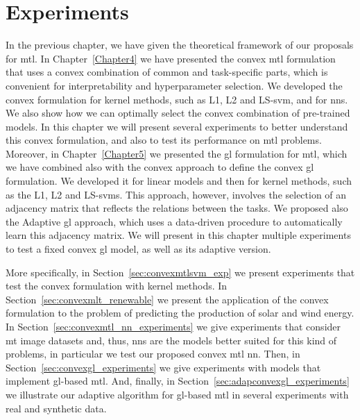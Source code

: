 
\chapter{Experiments} %
\label{Chapter6}


In the previous chapter, we have given the theoretical framework of our proposals for \acrfull{mtl}. In Chapter~\ref{Chapter4} we have presented the convex \acrshort{mtl} formulation that uses a convex combination of common and task-specific parts, which is convenient for interpretability and hyperparameter selection.
We developed the convex formulation for kernel methods, such as L1, L2 and LS-\acrfull{svm}, and for \acrfull{nns}. We also show how we can optimally select the convex combination of pre-trained models.
%
In this chapter we will present several experiments to better understand this convex formulation, and also to test its performance on \acrshort{mtl} problems.
%
Moreover, in Chapter~\ref{Chapter5} we presented the \acrfull{gl} formulation for \acrshort{mtl}, which we have combined also with the convex approach to define the convex \acrshort{gl} formulation.
We developed it for linear models and then for kernel methods, such as the L1, L2 and LS-\acrshort{svms}. This approach, however, involves the selection of an adjacency matrix that reflects the relations between the tasks. We proposed also the Adaptive \acrshort{gl} approach, which uses a data-driven procedure to automatically learn this adjacency matrix.
%
We will present in this chapter multiple experiments to test a fixed convex \acrshort{gl} model, as well as its adaptive version.
%

More specifically, in Section~\ref{sec:convexmtlsvm_exp} we present experiments that test the convex formulation with kernel methods. In Section~\ref{sec:convexmlt_renewable} we present the application of the convex formulation to the problem of predicting the production of solar and wind energy.
In Section~\ref{sec:convexmtl_nn_experiments} we give experiments that consider \acrfull{mt} image datasets and, thus, \acrshort{nns} are the models better suited for this kind of problems, in particular we test our proposed convex \acrshort{mtl} \acrshort{nn}. 
%
Then, in Section~\ref{sec:convexgl_experiments} we give experiments with models that implement \acrshort{gl}-based \acrshort{mtl}. And, finally, in Section~\ref{sec:adapconvexgl_experiments} we illustrate our adaptive algorithm for \acrshort{gl}-based \acrshort{mtl} in several experiments with real and synthetic data.






